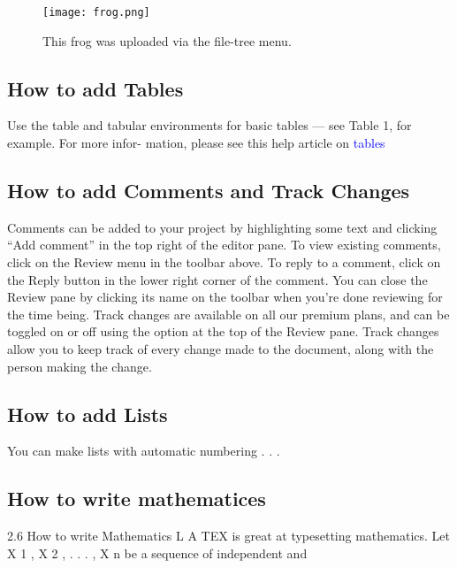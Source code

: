 \documentclass{article}
\begin{document}
    
\begin{figure}
	\centering
	\texttt{[image: frog.png]}
	\caption{ This frog was uploaded via the file-tree menu.}
	\label{fig:example}
\end{figure}
  
    \subsection{How to add Tables}
    Use the table and tabular environments for basic tables — see Table 1, for example. For more infor-
    mation, please see this help article on \textcolor{blue}{tables}
    
    \subsection{How to add Comments and Track Changes}
    Comments can be added to your project by highlighting some text and clicking “Add comment” in
    the top right of the editor pane. To view existing comments, click on the Review menu in the toolbar
    above. To reply to a comment, click on the Reply button in the lower right corner of the comment.
    You can close the Review pane by clicking its name on the toolbar when you’re done reviewing for the
    time being.
    Track changes are available on all our premium plans, and can be toggled on or off using the option
    at the top of the Review pane. Track changes allow you to keep track of every change made to the
    document, along with the person making the change.
    
    \subsection{How to add Lists}
    You can make lists with automatic numbering . . .
    
    
    \subsection{How to write mathematices}
    2.6
    How to write Mathematics
    L A TEX is great at typesetting mathematics. Let X 1 , X 2 , . . . , X n be a sequence of independent and

    
      
     
    
    
    
\end{document}
